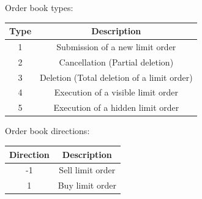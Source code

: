 \documentclass[xcolor={x11names,svgnames,dvipsnames}]{beamer}
\begin{document}
\begin{frame}


\begin{block}{Order book types:}
\begin{table}
\centering
     \begin{tabular}{|c|c|}
     \hline  Type& Description \\ 
     \hline 1& Submission of a new limit order  \\ 
     \hline 2& Cancellation (Partial deletion) \\ 
     \hline 3 & Deletion (Total deletion of a limit order)  \\ 
     \hline 4&   Execution of a visible limit order    \\ 
     \hline 5&   Execution of a hidden limit order\\ 
     \hline 
     \end{tabular} 
\end{table}
\end{block}

\begin{block}{Order book directions:}

\begin{table}
\centering
     \begin{tabular}{|c|c|}
     \hline  Direction& Description \\ 
     \hline -1 &  Sell limit order \\ 
     \hline 1&  Buy limit order\\ 
     \hline
     \end{tabular} 
\end{table}
\end{block}



\end{frame}
\end{document}
